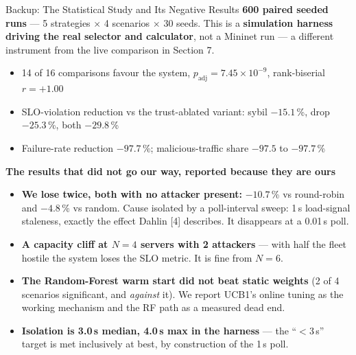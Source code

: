 \documentclass[aspectratio=169, 11pt]{beamer}
\begin{document}
\begin{frame}{Backup: The Statistical Study and Its Negative Results}
    \scriptsize
    \textbf{600 paired seeded runs} --- 5 strategies $\times$ 4 scenarios $\times$ 30 seeds.
    {\color{gray}This is a \textbf{simulation harness driving the real selector and
    calculator}, not a Mininet run --- a different instrument from the live
    comparison in Section 7.}
    \begin{itemize}\itemsep2pt
      \item 14 of 16 comparisons favour the system, $p_{\mathrm{adj}} = 7.45\times10^{-9}$, rank-biserial $r = +1.00$
      \item SLO-violation reduction vs the trust-ablated variant: sybil $-15.1$\,\%, drop $-25.3$\,\%, both $-29.8$\,\%
      \item Failure-rate reduction $-97.7$\,\%; malicious-traffic share $-97.5$ to $-97.7$\,\%
    \end{itemize}
    \vspace{3pt}
    \textbf{The results that did not go our way, reported because they are ours}
    \begin{itemize}\itemsep2pt
      \item \textbf{We lose twice, both with no attacker present:} $-10.7$\,\% vs round-robin and $-4.8$\,\% vs random. Cause isolated by a poll-interval sweep: 1\,s load-signal staleness, exactly the effect Dahlin [4] describes. It disappears at a 0.01\,s poll.
      \item \textbf{A capacity cliff at $N=4$ servers with 2 attackers} --- with half the fleet hostile the system loses the SLO metric. It is fine from $N=6$.
      \item \textbf{The Random-Forest warm start did not beat static weights} (2 of 4 scenarios significant, and \emph{against} it). We report UCB1's online tuning as the working mechanism and the RF path as a measured dead end.
      \item \textbf{Isolation is 3.0\,s median, 4.0\,s max in the harness} --- the ``$<$3\,s'' target is met inclusively at best, by construction of the 1\,s poll.
    \end{itemize}
\end{frame}
\end{document}
